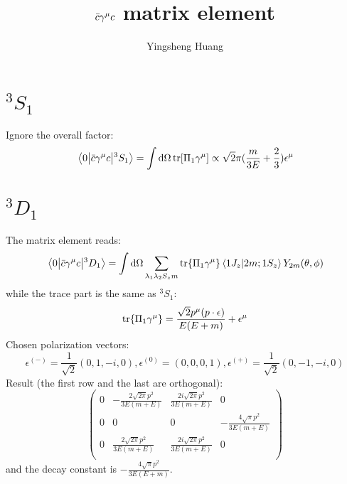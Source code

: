 \documentclass{article}
\title{$\bar c\gm c$ matrix element}
\author{Yingsheng Huang}
\newcommand{\gm}{\gamma^{\mu}}
\newcommand{\la}{\lambda}
\begin{document}
\maketitle
\section{$^3S_1$}
Ignore the overall factor:
$$\mel{0}{\bar c\gm c}{^3S_1}=\int\dd\Omega\tr[\Pi_1\gm]\propto\sqrt{2}\pi(\frac{m}{3 E}+\frac{2}{3})\epsilon^{\mu}$$
\section{$^3D_1$}
The matrix element reads:
$$\mel{0}{\bar c\gm c}{^3D_1}=\int\dd\Omega\sum_{\la_1\la_2 S_zm}\tr{\Pi_1\gm}\braket{1J_z}{2m;1S_z}Y_{2m}(\theta,\phi)$$
while the trace part is the same as $^3S_1$:
$$\tr{\Pi_1\gm}=\frac{\sqrt{2}p^{\mu}(p\cdot\epsilon)}{E(E+m)}+\epsilon^{\mu}$$
Chosen polarization vectors: 
$$\epsilon^{(-)}=\frac{1}{\sqrt{2}}(0,1,-i,0),\epsilon^{(0)}=(0,0,0,1),\epsilon^{(+)}=\frac{1}{\sqrt{2}}(0,-1,-i,0)$$
Result (the first row and the last are orthogonal):  
$$\left(
\begin{array}{cccc}
 0 & -\frac{2 \sqrt{2 \pi } p^2}{3 E (m+E)} & \frac{2 i \sqrt{2 \pi } p^2}{3 E (m+E)} & 0 \\
 0 & 0 & 0 & -\frac{4 \sqrt{\pi } p^2}{3 E (m+E)} \\
 0 & \frac{2 \sqrt{2 \pi } p^2}{3 E (m+E)} & \frac{2 i \sqrt{2 \pi } p^2}{3 E (m+E)} & 0 \\
\end{array}
\right)$$
and the decay constant is $-\frac{4 \sqrt{\pi } p^2}{3 E (E+m)}$.
\end{document}
